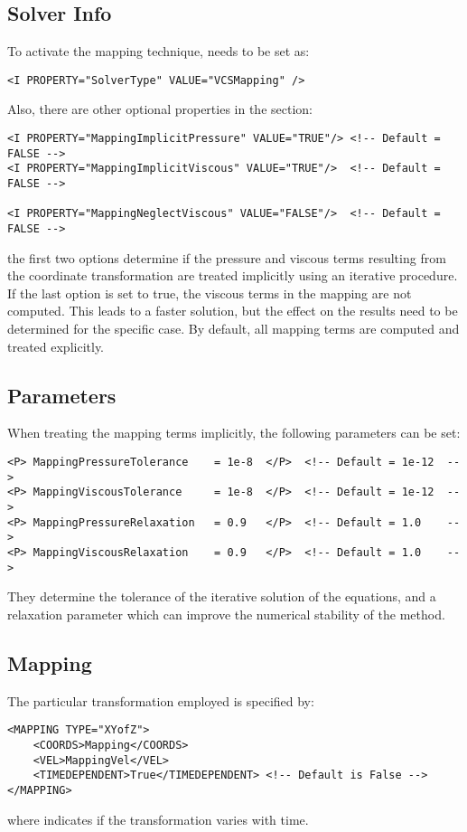 \subsection{Solver Info}

To activate the mapping technique,  needs to be set as:
\begin{lstlisting}[style=XMLStyle]
<I PROPERTY="SolverType" VALUE="VCSMapping" />
\end{lstlisting}
Also, there are other optional properties in the  section:
\begin{lstlisting}[style=XMLStyle]
<I PROPERTY="MappingImplicitPressure" VALUE="TRUE"/> <!-- Default = FALSE -->
<I PROPERTY="MappingImplicitViscous" VALUE="TRUE"/>  <!-- Default = FALSE -->

<I PROPERTY="MappingNeglectViscous" VALUE="FALSE"/>  <!-- Default = FALSE -->
\end{lstlisting}
the first two options determine if the pressure and viscous terms resulting from the
coordinate transformation are treated implicitly using an iterative procedure. If the last
option is set to true, the viscous terms in the mapping are not computed. This leads to a
faster solution, but the effect on the results need to be determined for the specific case. 
 By default, all mapping terms are computed and treated explicitly.
 
\subsection{Parameters}

When treating the mapping terms implicitly, the following parameters can be set:
\begin{lstlisting}[style=XMLStyle]
<P> MappingPressureTolerance    = 1e-8  </P>  <!-- Default = 1e-12  -->
<P> MappingViscousTolerance     = 1e-8  </P>  <!-- Default = 1e-12  -->
<P> MappingPressureRelaxation   = 0.9   </P>  <!-- Default = 1.0    -->
<P> MappingViscousRelaxation    = 0.9   </P>  <!-- Default = 1.0    -->
\end{lstlisting}
They determine the tolerance of the iterative solution of the equations, 
and a relaxation parameter which can improve the numerical stability of the method.

\subsection{Mapping}

The particular transformation employed is specified by:
\begin{lstlisting}[style=XMLStyle]
<MAPPING TYPE="XYofZ">
    <COORDS>Mapping</COORDS>
    <VEL>MappingVel</VEL>
    <TIMEDEPENDENT>True</TIMEDEPENDENT> <!-- Default is False -->
</MAPPING>
\end{lstlisting}
where  indicates if the transformation varies 
with time.

